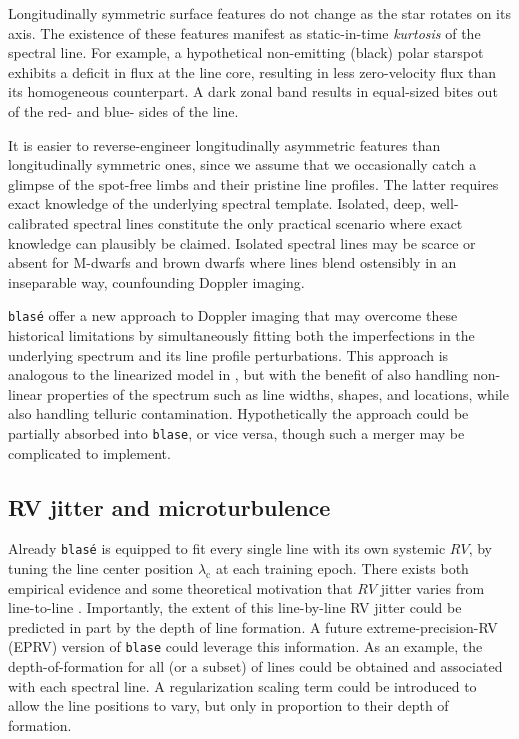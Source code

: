 \documentclass[twocolumn]{aastex631}
\begin{document}
Longitudinally symmetric surface features do not change as the star rotates on its axis.  The existence of these features manifest as static-in-time \emph{kurtosis} of the spectral line.  For example, a hypothetical non-emitting (black) polar starspot exhibits a deficit in flux at the line core, resulting in less zero-velocity flux than its homogeneous counterpart.  A dark zonal band results in equal-sized bites out of the red- and blue- sides of the line.

It is easier to reverse-engineer longitudinally asymmetric features than longitudinally symmetric ones, since we assume that we occasionally catch a glimpse of the spot-free limbs and their pristine line profiles.
The latter requires exact knowledge of the underlying spectral template.  Isolated, deep, well-calibrated spectral lines constitute the only practical scenario where exact knowledge can plausibly be claimed.  Isolated spectral lines may be scarce or absent for M-dwarfs and brown dwarfs where lines blend ostensibly in an inseparable way, counfounding Doppler imaging.

\texttt{blas\'e} offer a new approach to Doppler imaging that may overcome these historical limitations by simultaneously fitting both the imperfections in the underlying spectrum and its line profile perturbations.  This approach is analogous to the linearized model in \citet{2021arXiv211006271L}, but with the benefit of also handling non-linear properties of the spectrum such as line widths, shapes, and locations, while also handling telluric contamination.  Hypothetically the \citet{2021arXiv211006271L} approach could be partially absorbed into \texttt{blase}, or vice versa, though such a merger may be complicated to implement.


\subsection{RV jitter and microturbulence}

Already \texttt{blas\'e} is equipped to fit every single line with its own systemic $RV$, by tuning the line center position $\lambda_\mathrm{c}$ at each training epoch.  There exists both empirical evidence and some theoretical motivation that $RV$ jitter varies from line-to-line \citep{2018A&A...620A..47D}.  Importantly, the extent of this line-by-line RV jitter could be predicted in part by the depth of line formation.  A future extreme-precision-RV (EPRV) version of \texttt{blase} could leverage this information.  As an example, the depth-of-formation for all (or a subset) of lines could be obtained and associated with each spectral line.  A regularization scaling term could be introduced to allow the line positions to vary, but only in proportion to their depth of formation.
\end{document}
